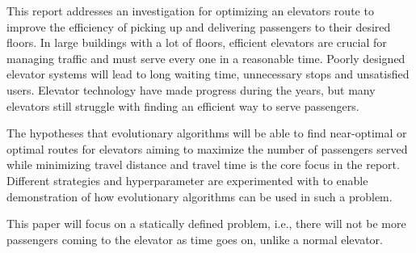
This report addresses an investigation for optimizing an elevators route to improve the efficiency of picking up and delivering passengers to their desired floors.
In large buildings with a lot of floors, efficient elevators are crucial for managing traffic and must serve every one in a reasonable time.
Poorly designed elevator systems will lead to long waiting time, unnecessary stops and unsatisfied users.
Elevator technology have made progress during the years, but many elevators still struggle with finding an efficient way
to serve passengers.

The hypotheses that evolutionary algorithms will be able to find near-optimal or optimal routes for elevators
aiming to maximize the number of passengers served while minimizing travel distance and travel time is
the core focus in the report. Different strategies and hyperparameter are experimented with to enable
demonstration of how evolutionary algorithms can be used in such a problem.

This paper will focus on a statically defined problem, i.e., there will not be more passengers coming to the elevator as time goes on, unlike a normal elevator.
